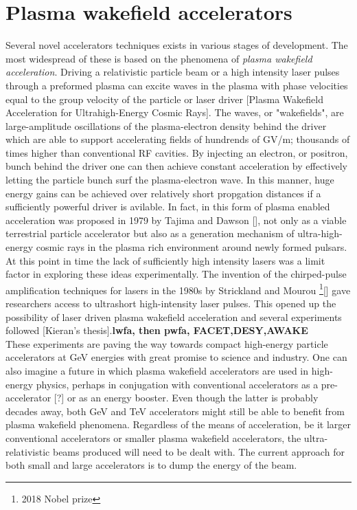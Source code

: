 \documentclass[%
 onecolumn,notitlepage,
 amsmath,amssymb,
 aps,
 longbibliography
]{revtex4-1}
\begin{document}
\section{Plasma wakefield accelerators}\vspace{-8pt}
Several novel accelerators techniques exists in various stages of development. The most widespread of these is based on the phenomena of \textit{plasma wakefield acceleration}. Driving a relativistic particle beam or a high intensity laser pulses through a preformed plasma can excite waves in the plasma with phase velocities equal to the group velocity of the particle or laser driver [Plasma Wakefield Acceleration for Ultrahigh-Energy Cosmic Rays]. The waves, or "wakefields", are large-amplitude oscillations of the plasma-electron density behind the driver which are able to support accelerating fields of hundrends of GV/m; thousands of times higher than conventional RF cavities. By injecting an electron, or positron, bunch behind the driver one can then achieve constant acceleration by effectively letting the particle bunch surf the plasma-electron wave. In this manner, huge energy gains can be achieved over relatively short propgation distances if a sufficiently powerful driver is avilable. In fact, in this form of plasma enabled acceleration was proposed in 1979 by Tajima and Dawson [], not only as a viable terrestrial particle accelerator but also as a generation mechanism of ultra-high-energy cosmic rays in the plasma rich environment around newly formed pulsars. At this point in time the lack of sufficiently high intensity lasers was a limit factor in exploring these ideas experimentally. The invention of the chirped-pulse amplification techniques for lasers in the 1980s by Strickland and Mourou \footnote{2018 Nobel prize }[] gave researchers access to ultrashort high-intensity laser pulses. This opened up the possibility of laser driven plasma wakefield acceleration and several experiments followed [Kieran's thesis].\textbf{lwfa, then pwfa, FACET,DESY,AWAKE}\\ 
These experiments are paving the way towards compact high-energy particle accelerators at GeV energies with great promise to science and industry. One can also imagine a future in which plasma wakefield accelerators are used in high-energy physics, perhaps in conjugation with conventional accelerators as a pre-accelerator [?] or as an energy booster. Even though the latter is probably decades away, both GeV and TeV accelerators might still be able to benefit from plasma wakefield phenomena. Regardless of the means of acceleration, be it larger conventional accelerators or smaller plasma wakefield accelerators, the ultra-relativistic beams produced will need to be dealt with. The current approach for both small and large accelerators is to dump the energy of the beam. \vspace{-8pt}
\end{document}
